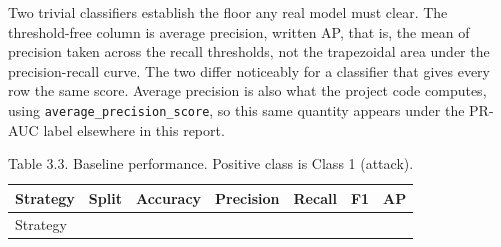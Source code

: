 \documentclass[
  canadian,
  12pt,
]{article}
\begin{document}
Two trivial classifiers establish the floor any real model must clear.
The threshold-free column is average precision, written AP, that is, the
mean of precision taken across the recall thresholds, not the
trapezoidal area under the precision-recall curve. The two differ
noticeably for a classifier that gives every row the same score. Average
precision is also what the project code computes, using
\texttt{average\_precision\_score}, so this same quantity appears under
the PR-AUC label elsewhere in this report.

\begin{longtable}[]{@{}
  >{\raggedright\arraybackslash}p{}
  >{\raggedright\arraybackslash}p{}
  >{\raggedleft\arraybackslash}p{}
  >{\raggedleft\arraybackslash}p{}
  >{\raggedleft\arraybackslash}p{}
  >{\raggedleft\arraybackslash}p{}
  >{\raggedleft\arraybackslash}p{}@{}}
\caption[Table 3.3. Baseline performance.]{Table 3.3. Baseline performance. Positive class is Class 1
(attack).}\tabularnewline
\toprule\noalign{}
\begin{minipage}[b]{\linewidth}\raggedright
Strategy
\end{minipage} & \begin{minipage}[b]{\linewidth}\raggedright
Split
\end{minipage} & \begin{minipage}[b]{\linewidth}\raggedleft
Accuracy
\end{minipage} & \begin{minipage}[b]{\linewidth}\raggedleft
Precision
\end{minipage} & \begin{minipage}[b]{\linewidth}\raggedleft
Recall
\end{minipage} & \begin{minipage}[b]{\linewidth}\raggedleft
F1
\end{minipage} & \begin{minipage}[b]{\linewidth}\raggedleft
AP
\end{minipage} \\
\midrule\noalign{}
\endfirsthead
\toprule\noalign{}
\begin{minipage}[b]{\linewidth}\raggedright
Strategy
\end{minipage} & \begin{minipage}[b]{\linewidth}\raggedright

\end{minipage}
\end{longtable}
\end{document}
